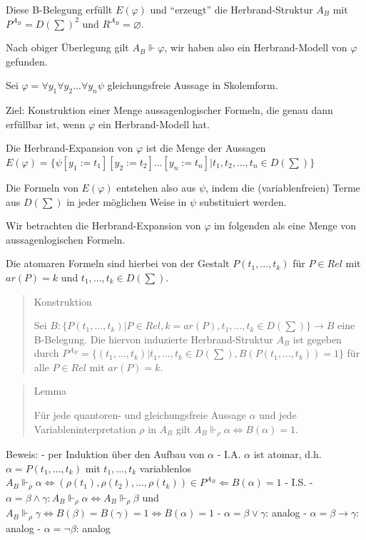 \documentclass[a4paper]{article}
\begin{document}
\begin{multicols}{3}
  Diese B-Belegung erfüllt $E(\varphi)$ und ``erzeugt'' die
  Herbrand-Struktur $A_B$ mit $P^{A_B}=D(\sum)^2$ und
  $R^{A_B}=\varnothing$.

  Nach obiger Überlegung gilt $A_B\Vdash\varphi$, wir haben also ein
  Herbrand-Modell von $\varphi$ gefunden.

  Sei $\varphi=\forall y_1\forall y_2...\forall y_n\psi$ gleichungsfreie
  Aussage in Skolemform.

  Ziel: Konstruktion einer Menge aussagenlogischer Formeln, die genau dann
  erfüllbar ist, wenn $\varphi$ ein Herbrand-Modell hat.

  Die Herbrand-Expansion von $\varphi$ ist die Menge der Aussagen
  $E(\varphi)=\{\psi[y_1:=t_1][y_2:=t_2]...[y_n:=t_n]|t_1,t_2,...,t_n\in D(\sum)\}$

  Die Formeln von $E(\varphi)$ entstehen also aus $\psi$, indem die
  (variablenfreien) Terme aus $D(\sum)$ in jeder möglichen Weise in $\psi$
  substituiert werden.

  Wir betrachten die Herbrand-Expansion von $\varphi$ im folgenden als
  eine Menge von aussagenlogischen Formeln.

  Die atomaren Formeln sind hierbei von der Gestalt $P(t_1,...,t_k)$ für
  $P\in Rel$ mit $ar(P)=k$ und $t_1,...,t_k\in D(\sum)$.

  \begin{quote}
    Konstruktion

    Sei
    $B:\{P(t_1,...,t_k)|P\in Rel,k=ar(P),t_1,...,t_k\in D(\sum)\}\rightarrow B$
    eine B-Belegung. Die hiervon induzierte Herbrand-Struktur $A_B$ ist
    gegeben durch
    $P^{A_B} = \{(t_1,...,t_k)|t_1,...,t_k\in D(\sum),B(P(t_1,...,t_k))= 1\}$
    für alle $P\in Rel$ mit $ar(P)=k$.
  \end{quote}

  \begin{quote}
    Lemma

    Für jede quantoren- und gleichungsfreie Aussage $\alpha$ und jede
    Variableninterpretation $\rho$ in $A_B$ gilt
    $A_B\Vdash_\rho\alpha \Leftrightarrow B(\alpha)= 1$.
  \end{quote}

  Beweis: - per Induktion über den Aufbau von $\alpha$ - I.A. $\alpha$ ist
  atomar, d.h. $\alpha= P(t_1,...,t_k)$ mit $t_1,...,t_k$ variablenlos
  $A_B\Vdash_\rho \alpha\Leftrightarrow (\rho(t_1),\rho(t_2),...,\rho(t_k))\in P^{A_B}\Leftarrow B(\alpha)= 1$
  - I.S. -
  $\alpha=\beta\wedge\gamma: A_B\Vdash_\rho \alpha\Leftrightarrow A_B \Vdash_\rho\beta$
  und
  $A_B\Vdash_\rho\gamma \Leftrightarrow B(\beta)=B(\gamma)= 1 \Leftrightarrow B(\alpha)= 1$
  - $\alpha=\beta\vee\gamma$: analog - $\alpha=\beta\rightarrow\gamma$:
  analog - $\alpha=\lnot\beta$: analog


\end{multicols}
\end{document}
